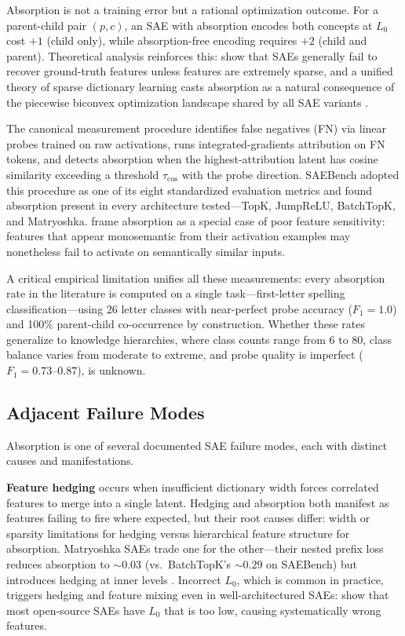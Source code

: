 \documentclass{article}
\begin{document}
Absorption is not a training error but a rational optimization outcome. For a parent-child pair $(p, c)$, an SAE with absorption encodes both concepts at $L_0$ cost $+1$ (child only), while absorption-free encoding requires $+2$ (child and parent). Theoretical analysis reinforces this: \citet{cui2025limits} show that SAEs generally fail to recover ground-truth features unless features are extremely sparse, and a unified theory of sparse dictionary learning casts absorption as a natural consequence of the piecewise biconvex optimization landscape shared by all SAE variants \citep{wright2025absorption}.

The canonical measurement procedure identifies false negatives (FN) via linear probes trained on raw activations, runs integrated-gradients attribution on FN tokens, and detects absorption when the highest-attribution latent has cosine similarity exceeding a threshold $\tau_{\cos}$ with the probe direction. SAEBench \citep{karvonen2025saebench} adopted this procedure as one of its eight standardized evaluation metrics and found absorption present in every architecture tested---TopK, JumpReLU, BatchTopK, and Matryoshka. \citet{tian2025sensitivity} frame absorption as a special case of poor feature sensitivity: features that appear monosemantic from their activation examples may nonetheless fail to activate on semantically similar inputs.

A critical empirical limitation unifies all these measurements: every absorption rate in the literature is computed on a single task---first-letter spelling classification---using 26 letter classes with near-perfect probe accuracy ($F_1 = 1.0$) and 100\% parent-child co-occurrence by construction. Whether these rates generalize to knowledge hierarchies, where class counts range from 6 to 80, class balance varies from moderate to extreme, and probe quality is imperfect ($F_1 = 0.73$--$0.87$), is unknown.

\subsection{Adjacent Failure Modes}

Absorption is one of several documented SAE failure modes, each with distinct causes and manifestations.

\textbf{Feature hedging} \citep{chanin2025hedging} occurs when insufficient dictionary width forces correlated features to merge into a single latent. Hedging and absorption both manifest as features failing to fire where expected, but their root causes differ: width or sparsity limitations for hedging versus hierarchical feature structure for absorption. Matryoshka SAEs trade one for the other---their nested prefix loss reduces absorption to ${\sim}0.03$ (vs.\ BatchTopK's ${\sim}0.29$ on SAEBench) but introduces hedging at inner levels \citep{chanin2025hedging}. Incorrect $L_0$, which is common in practice, triggers hedging and feature mixing even in well-architectured SAEs: \citet{chanin2025sparse} show that most open-source SAEs have $L_0$ that is too low, causing systematically wrong features.
\end{document}
